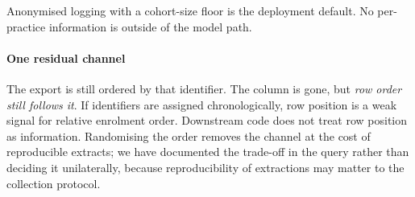 \label{sec:sidechannels}
\statusMethod

\begin{shortanswer}
Anonymised logging with a cohort-size floor is the deployment default. No per-practice information
is outside of the model path.
\end{shortanswer}

\paragraph{One residual channel} The export is still ordered by that identifier. The column is
gone, but \emph{row order still follows it}. If identifiers are assigned chronologically, row
position is a weak signal for relative enrolment order. Downstream code does not treat row position
as information. Randomising the order removes the channel at the cost of reproducible extracts; we
have documented the trade-off in the query rather than deciding it unilaterally, because
reproducibility of extractions may matter to the collection protocol.
